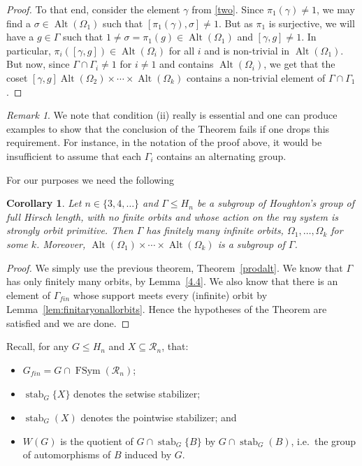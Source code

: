 \documentclass[11pt,a4paper]{amsart}
\newtheorem{corollary}[theorem]{Corollary}
\theoremstyle{definition}
\theoremstyle{remark}
\newtheorem{remark}[theorem]{Remark}
\newcommand{\FSym}{\operatorname{FSym}}
\newcommand{\Alt}{\operatorname{Alt}}
\newcommand{\Ra}{\mathcal{R}}
\newcommand{\gfin}{G_{\textit{fin}}}
\newcommand{\gamfin}{\Gamma_{\textit{fin}}}
\newcommand{\stab}{\operatorname{stab}}
\begin{document}
\begin{proof}
	To that end, consider the element $\gamma$ from \ref{two}. Since $\pi_1(\gamma) \neq 1$, we may find a $\sigma \in \Alt(\Omega_1)$ such that $[\pi_1 (\gamma), \sigma] \neq 1$. But as $\pi_1$ is surjective, we will have a $g \in \Gamma$ such that $1 \neq \sigma = \pi_1(g) \in \Alt(\Omega_1)$ and $[\gamma, g] \neq 1$. In particular, $\pi_i([\gamma,g]) \in \Alt(\Omega_i) $ for all $i$ and is non-trivial in $\Alt(\Omega_1)$. But now, since   $\Gamma \cap \Gamma_i \neq 1$ for $i \neq 1$ and contains $\Alt(\Omega_i)$, we get that the coset $[\gamma,g] \Alt(\Omega_2) \times \cdots \times \Alt(\Omega_k)$ contains a non-trivial element of $\Gamma \cap \Gamma_1$. 
\end{proof}


\begin{remark}
	We note that condition (ii) really is essential and one can produce examples to show that the conclusion of the Theorem fails if one drops this requirement. For instance, in the notation of the proof above, it would be insufficient to assume that each $\Gamma_i$ contains an alternating group. 
\end{remark}

For our purposes we need the following

\begin{corollary}
	\label{prodalt for houghton}
	Let $n\in \{3, 4, \ldots\}$ and  $\Gamma \leq H_n$ be a subgroup of Houghton's group of full Hirsch length, with no finite orbits and whose action on the ray system is strongly orbit primitive. Then $\Gamma$ has finitely many infinite orbits, $\Omega_1, \ldots, \Omega_k$ for some $k$. Moreover, $\Alt(\Omega_1) \times \cdots \times \Alt(\Omega_k)$ is a subgroup of $\Gamma$.  
\end{corollary}
\begin{proof}
	We simply use the previous theorem, Theorem~\ref{prodalt}. We know that $\Gamma$ has only finitely many orbits, by Lemma~\ref{4.4}. We also know that there is an element of $\gamfin$ whose support meets every (infinite) orbit by Lemma~\ref{lem:finitaryonallorbits}.  Hence the hypotheses of the Theorem are satisfied and we are done. 
\end{proof}


Recall, for any $G\le H_n$ and $X\subseteq \Ra_n$, that:
\begin{itemize}
\item $\gfin=G\cap \FSym(\Ra_n)$;
\item $\stab_G\{X\}$ denotes the setwise stabilizer;
\item $\stab_G(X)$ denotes the pointwise stabilizer; and
\item $W(G)$ is the quotient of $G\cap\stab_G\{B\}$ by $G\cap\stab_G(B)$, i.e.\
the group of automorphisms of $B$ induced by $G$.
\end{itemize}
\end{document}
